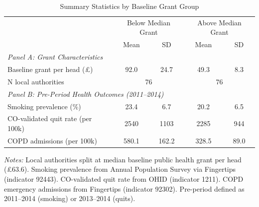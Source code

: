 \begin{table}[t]
\centering
\caption{Summary Statistics by Baseline Grant Group}
\label{tab:summary}
\begin{tabular}{lcccc}
\hline\hline
 & \multicolumn{2}{c}{Below Median Grant} & \multicolumn{2}{c}{Above Median Grant} \\
 & Mean & SD & Mean & SD \\
\hline
\multicolumn{5}{l}{\textit{Panel A: Grant Characteristics}} \\
Baseline grant per head (\pounds) & 92.0 & 24.7 & 49.3 & 8.3 \\
N local authorities & \multicolumn{2}{c}{76} & \multicolumn{2}{c}{76} \\
\hline
\multicolumn{5}{l}{\textit{Panel B: Pre-Period Health Outcomes (2011--2014)}} \\
Smoking prevalence (\%) & 23.4 & 6.7 & 20.2 & 6.5 \\
CO-validated quit rate (per 100k) & 2540 & 1103 & 2285 & 944 \\
COPD admissions (per 100k) & 580.1 & 162.2 & 328.5 & 89.0 \\
\hline\hline
\end{tabular}
\begin{tablenotes}
\item \textit{Notes:} Local authorities split at median baseline public health grant per head (\pounds63.6). Smoking prevalence from Annual Population Survey via Fingertips (indicator 92443). CO-validated quit rate from OHID (indicator 1211). COPD emergency admissions from Fingertips (indicator 92302). Pre-period defined as 2011--2014 (smoking) or 2013--2014 (quits).
\end{tablenotes}
\end{table}

